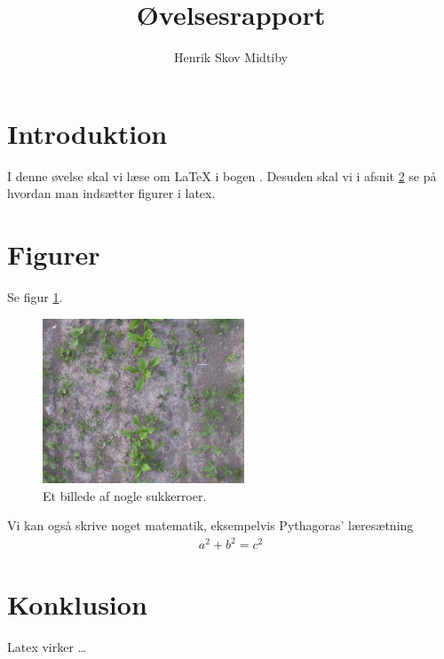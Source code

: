 \documentclass[a4paper]{article}
\title{Øvelsesrapport}
\author{Henrik Skov Midtiby}
\begin{document}
\maketitle

\section{Introduktion}

I denne øvelse skal vi læse om \LaTeX{} i bogen
\parencite{companion}.
Desuden skal vi i afsnit \ref{secFigurer} se på hvordan 
man indsætter figurer i latex.


\section{Figurer}
\label{secFigurer}

Se figur \ref{figEtBilledeAfNogleSukkerroer}.

\begin{figure}[h]
\centering
\includegraphics[width=6cm]{img/image.jpg}
\caption{Et billede af nogle sukkerroer.}
\label{figEtBilledeAfNogleSukkerroer}
\end{figure}

Vi kan også skrive noget matematik, eksempelvis 
Pythagoras' læresætning
\begin{align}
a^2 + b^2 = c^2
\end{align}

\section{Konklusion}

Latex virker \ldots


\printbibliography
\end{document}
